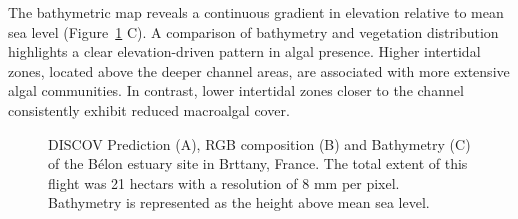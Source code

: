 \documentclass[
  letterpaper,
  DIV=11,
  numbers=noendperiod]{scrartcl}
\begin{document}
The bathymetric map reveals a continuous gradient in elevation relative
to mean sea level (Figure~\ref{fig-Belon} C). A comparison of bathymetry
and vegetation distribution highlights a clear elevation-driven pattern
in algal presence. Higher intertidal zones, located above the deeper
channel areas, are associated with more extensive algal communities. In
contrast, lower intertidal zones closer to the channel consistently
exhibit reduced macroalgal cover.

\label{cell-fig-Belon}
\begin{figure}[H]


\caption{\label{fig-Belon}DISCOV Prediction (A), RGB composition (B) and
Bathymetry (C) of the Bélon estuary site in Brttany, France. The total
extent of this flight was 21 hectars with a resolution of 8 mm per
pixel. Bathymetry is represented as the height above mean sea level.}

\end{figure}%
\end{document}
